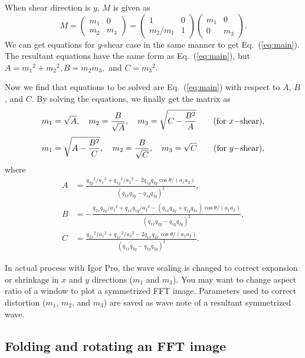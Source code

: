 \documentclass[a4paper]{article}
\begin{document}
When shear direction is $y$, $M$ is given as
\begin{equation}
M=\left(
\begin{array}{cc}
m_1 & 0 \\
m_2 & m_3
\end{array}
\right)=\left(
\begin{array}{cc}
1 & 0 \\
m_2/m_1 & 1
\end{array}
\right)\left(
\begin{array}{cc}
m_1 & 0 \\
0 & m_3
\end{array}
\right).
\label{eq:my}
\end{equation}
We can get equations for $y$-shear case in the same manner to get Eq.~(\ref{eq:main}).
The resultant equations have the same form as Eq.~(\ref{eq:main}), but $A = {m_1}^2+{m_2}^2, B = m_2m_3,$ and $C = {m_3}^2$.

Now we find that equations to be solved are Eq.~(\ref{eq:main}) with respect to $A$, $B$, and $C$.
By solving the equations, we finally get the matrix as
\begin{equation}
m_1 = \sqrt{A},\quad m_2 = \frac{B}{\sqrt{A}},\quad m_3 = \sqrt{C-\frac{B^2}{A}}\qquad{\rm (for\ }x{\rm -shear)},
\end{equation}
\begin{equation}
m_1 = \sqrt{A-\frac{B^2}{C}},\quad m_2 = \frac{B}{\sqrt{C}},\quad m_3 = \sqrt{C}\qquad{\rm (for\ }y{\rm -shear)},
\end{equation}
where
\begin{align}
A &= \frac{{q_{2y}}^2/{a_1}^2+{q_{1y}}^2/{a_2}^2-2q_{1y}q_{2y}\cos\theta/(a_1a_2)}{(q_{1x}q_{2y}-q_{1y}q_{2y})^2},\\
B &= -\frac{q_{2x}q_{2y}/{a_1}^2+q_{1x}q_{1y}/{a_2}^2-(q_{1x}q_{2y}+q_{1y}q_{2x})\cos\theta/(a_1a_2)}{(q_{1x}q_{2y}-q_{1y}q_{2y})^2},\\
C &= \frac{{q_{2x}}^2/{a_1}^2+{q_{1x}}^2/{a_2}^2-2q_{1x}q_{2x}\cos\theta/(a_1a_2)}{(q_{1x}q_{2y}-q_{1y}q_{2y})^2}.
\end{align}

In actual process with Igor Pro, the wave scaling is changed to correct expansion or shrinkage in $x$ and $y$ directions ($m_1$ and $m_3$).
You may want to change aspect ratio of a window to plot a symmetrized FFT image.
Parameters used to correct distortion ($m_1$, $m_2$, and $m_3$) are saved as wave note of a resultant symmetrized wave.

\subsection*{Folding and rotating an FFT image}
\end{document}
